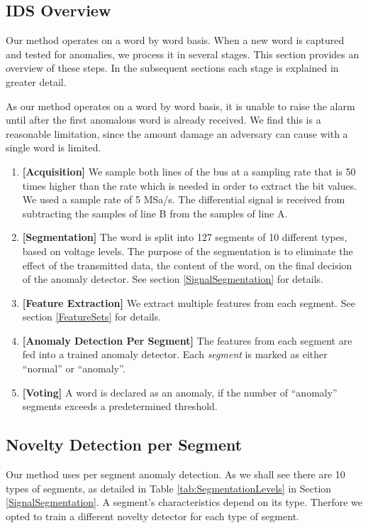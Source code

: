 \documentclass[conference]{IEEEtran}
\begin{document}
\subsection{IDS Overview} \label{Overview}
  Our method operates on a word by word basis. When a new word is captured and tested for anomalies, we process it in several stages. This section provides an overview of these steps. In the subsequent sections each stage is explained in greater detail.
  
  As our method operates on a word by word basis, it is unable to raise the alarm until after the first anomalous word is already received. We find this is a reasonable limitation, since the amount damage an adversary can cause with a single word is limited. 
  
  \begin{enumerate}
    \item \textbf{[Acquisition]}
          We sample both lines of the bus at a sampling rate that is 50 times higher than the rate which is needed in order to extract the bit values. We used a sample rate of 5 MSa/s. The differential signal is received from subtracting the samples of line B from the samples of line A.
    \item \textbf{[Segmentation]}
          The word is split into 127 segments of 10 different types, based on voltage levels. The purpose of the segmentation is to eliminate the effect of the transmitted data, the content of the word, on the final decision of the anomaly detector. See section \ref{SignalSegmentation} for details.
    \item \textbf{[Feature Extraction]}
          We extract multiple features from each segment. See section \ref{FeatureSets} for details.
    \item \textbf{[Anomaly Detection Per Segment]}
          The features from each segment are fed into a trained anomaly detector. Each \textit{segment} is marked as either ``normal'' or ``anomaly''.
    \item \textbf{[Voting]}
          A word is declared as an anomaly, if the number of ``anomaly'' segments exceeds a predetermined threshold.
  \end{enumerate}
  
\subsection{Novelty Detection per Segment}
  Our method uses per segment anomaly detection. As we shall see there are 10 types of segments, as detailed in Table \ref{tab:SegmentationLevels} in Section \ref{SignalSegmentation}. A segment's characteristics depend on its type. Therfore we opted to train a different novelty detector for each type of segment.
  
\end{document}
